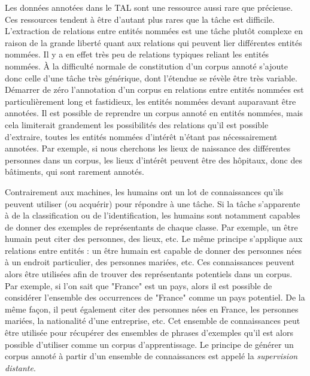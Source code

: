 \documentclass[PhD-Yoann-Dupont.tex]{subfiles}
\begin{document}
Les données annotées dans le TAL sont une ressource aussi rare que précieuse. Ces ressources tendent à être d'autant plus rares que la tâche est difficile. L'extraction de relations entre entités nommées est une tâche plutôt complexe en raison de la grande liberté quant aux relations qui peuvent lier différentes entités nommées. Il y a en effet très peu de relations typiques reliant les entités nommées. À la difficulté normale de constitution d'un corpus annoté s'ajoute donc celle d'une tâche très générique, dont l'étendue se révèle être très variable. Démarrer de zéro l'annotation d'un corpus en relations entre entités nommées est particulièrement long et fastidieux, les entités nommées devant auparavant être annotées. Il est possible de reprendre un corpus annoté en entités nommées, mais cela limiterait grandement les possibilités des relations qu'il est possible d'extraire, toutes les entités nommées d'intérêt n'étant pas nécessairement annotées. Par exemple, si nous cherchons les lieux de naissance des différentes personnes dans un corpus, les lieux d'intérêt peuvent être des hôpitaux, donc des bâtiments, qui sont rarement annotés.

Contrairement aux machines, les humains ont un lot de connaissances qu'ils peuvent utiliser (ou acquérir) pour répondre à une tâche. Si la tâche s'apparente à de la classification ou de l'identification, les humains sont notamment capables de donner des exemples de représentants de chaque classe. Par exemple, un être humain peut citer des personnes, des lieux, etc. Le même principe s'applique aux relations entre entités : un être humain est capable de donner des personnes nées à un endroit particulier, des personnes mariées, etc. Ces connaissances peuvent alors être utilisées afin de trouver des représentants potentiels dans un corpus. Par exemple, si l'on sait que "France" est un pays, alors il est possible de considérer l'ensemble des occurrences de "France" comme un pays potentiel. De la même façon, il peut également citer des personnes nées en France, les personnes mariées, la nationalité d'une entreprise, etc. Cet ensemble de connaissances peut être utilisée pour récupérer des ensembles de phrases d'exemples qu'il est alors possible d'utiliser comme un corpus d'apprentissage. Le principe de générer un corpus annoté à partir d'un ensemble de connaissances est appelé la \emph{supervision distante}.
\end{document}
